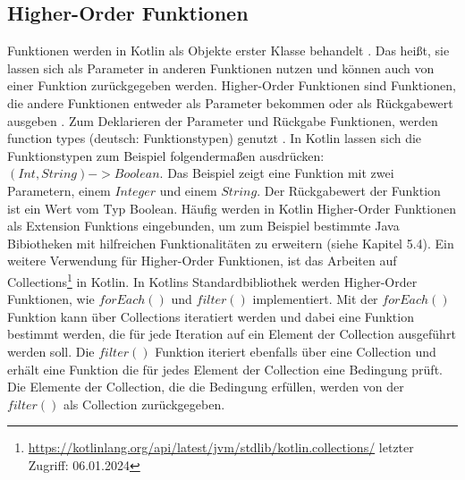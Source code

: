 \documentclass{article}
\begin{document}
\subsection{Higher-Order Funktionen}
Funktionen werden in Kotlin als Objekte erster Klasse behandelt \cite{KotlinLangDocHigherOrder}. Das heißt, sie lassen sich als Parameter in anderen Funktionen nutzen und können auch von einer Funktion zurückgegeben werden. Higher-Order Funktionen sind Funktionen, die andere Funktionen entweder als Parameter bekommen oder als Rückgabewert ausgeben \cite{KotlinLangDocHigherOrder}. Zum Deklarieren der Parameter und Rückgabe Funktionen, werden function types (deutsch: Funktionstypen) genutzt \cite{KotlinLangDocHigherOrder}. In Kotlin lassen sich die Funktionstypen zum Beispiel folgendermaßen ausdrücken: $(Int, String) -> Boolean$. Das Beispiel zeigt eine Funktion mit zwei Parametern, einem $Integer$ und einem $String$. Der Rückgabewert der Funktion ist ein Wert vom Typ Boolean. Häufig werden in Kotlin Higher-Order Funktionen als Extension Funktions eingebunden, um zum Beispiel bestimmte Java Bibiotheken mit hilfreichen Funktionalitäten zu erweitern (siehe Kapitel 5.4). Ein weitere Verwendung für Higher-Order Funktionen, ist das Arbeiten auf Collections\footnote{\url{https://kotlinlang.org/api/latest/jvm/stdlib/kotlin.collections/} letzter Zugriff: 06.01.2024} in Kotlin. In Kotlins Standardbibliothek werden Higher-Order Funktionen, wie $forEach()$ und $filter()$ implementiert. Mit der $forEach()$ Funktion kann über Collections iteratiert werden und dabei eine Funktion bestimmt werden, die für jede Iteration auf ein Element der Collection ausgeführt werden soll. Die $filter()$ Funktion iteriert ebenfalls über eine Collection und erhält eine Funktion die für jedes Element der Collection eine Bedingung prüft. Die Elemente der Collection, die die Bedingung erfüllen, werden von der $filter()$ als Collection zurückgegeben.
\end{document}
